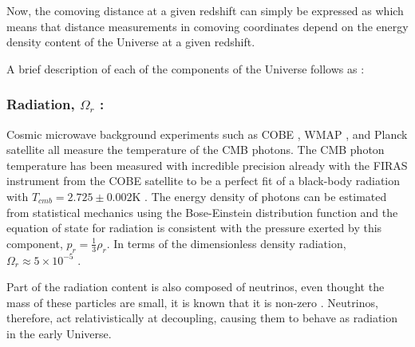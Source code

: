 \qquad Now, the comoving distance at a given redshift can simply be expressed as
which means that distance measurements in comoving coordinates depend on the energy density content of the Universe at a given redshift. 

\qquad A brief description of each of the components of the Universe follows as \citep{dods,schneider_2016}:

\subsubsection{Radiation, $\Omega_r$ :}
 Cosmic microwave background experiments such as COBE \citep{COBE}, WMAP \citep{WMAP_MapsResults,WMAP_Cosmology}, and Planck satellite \citep{2018PlanckCosmology} all measure the temperature of the CMB photons. The CMB photon temperature has been measured with incredible precision already with the FIRAS instrument from the COBE satellite to be a perfect fit of a black-body radiation with $T_{cmb} = 2.725\pm 0.002$K \citep{1999FIRAS}. The energy density of photons can be estimated from statistical mechanics using the Bose-Einstein distribution function \citep{dods}
and the equation of state for radiation is consistent with the pressure exerted by this component, $p_r = \frac{1}{3}\rho_r$. In terms of the dimensionless density radiation, $\Omega_r \approx 5 \times 10^{-5}$ \citep{schneider_2016}.

\qquad Part of the radiation content is also composed of neutrinos, even thought the mass of these particles are small, it is known that it is non-zero \citep{Kamiokande1998}. Neutrinos, therefore, act relativistically at decoupling, causing them to behave as radiation in the early Universe.

